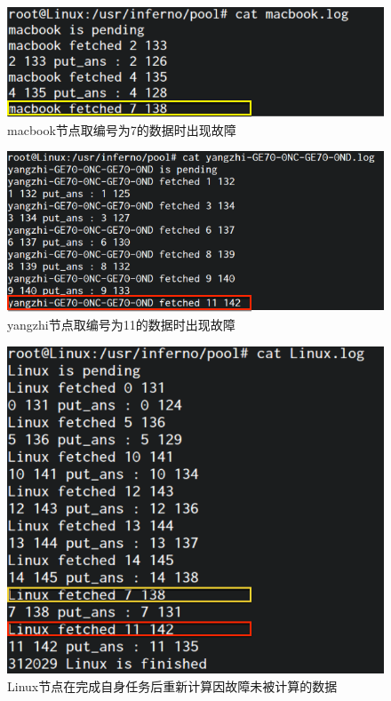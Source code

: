 \documentclass[paper=a4]{ctexart} %
\numberwithin{equation}{section} %
\numberwithin{figure}{section} %
\numberwithin{table}{section} %
\begin{document}
\begin{figure}[h]
\centering
\includegraphics[width=1\textwidth]{pic/error2.png}
\caption{macbook节点取编号为7的数据时出现故障}
\end{figure}

\begin{figure}[h]
\centering
\includegraphics[width=1\textwidth]{pic/error3.png}
\caption{yangzhi节点取编号为11的数据时出现故障}
\end{figure}

\begin{figure}[h]
\centering
\includegraphics[width=1\textwidth]{pic/error1.png}
\caption{Linux节点在完成自身任务后重新计算因故障未被计算的数据}
\end{figure}
\end{document}
